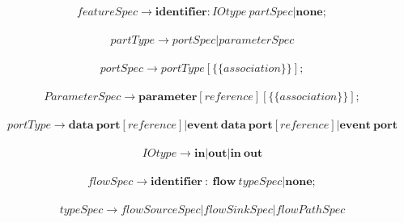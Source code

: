 \documentclass[UTF8]{ctexart}
\begin{document}
\begin{equation*} 
\begin{split}
featureSpec \rightarrow \bm{identifier :}IOtype \ partSpec | \bm{none ;}
\end{split}
\end{equation*}

\begin{equation*} 
\begin{split}
partType \rightarrow portSpec | parameterSpec
\end{split}
\end{equation*}

\begin{equation*} 
\begin{split}
portSpec \rightarrow  portType [ \bm{\{} \{ association \} \bm{\}} ] \bm{;}
\end{split}
\end{equation*}


\begin{equation*} 
\begin{split}
ParameterSpec \rightarrow  \bm{parameter} [ reference ][ \bm{\{} \{ association \} \bm{\}} ] \bm{;}
\end{split}
\end{equation*}

\begin{equation*} 
\begin{split}
portType \rightarrow \bm{data \  port}[ reference ] | \bm{event \ data \ port} [ reference ]| \bm{event \  port}
\end{split}
\end{equation*}

\begin{equation*} 
\begin{split}
IOtype \rightarrow \bm{in} | \bm{out} | \bm{in \ out} 
\end{split}
\end{equation*}

\begin{equation*} 
\begin{split}
flowSpec \rightarrow \bm{identifier \ : \ flow} \ typeSpec| \bm{none;}
\end{split}
\end{equation*}

\begin{equation*} 
\begin{split}
typeSpec \rightarrow flowSourceSpec | flowSinkSpec | flowPathSpec
\end{split}
\end{equation*}
\end{document}

